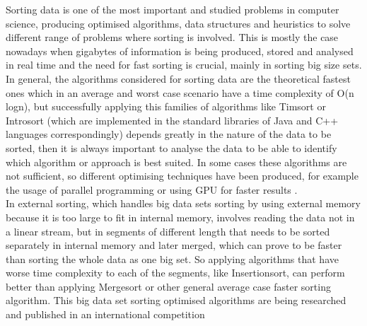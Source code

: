 \documentclass[a4paper,12pt]{article}
\begin{document}
Sorting data is one of the most important and studied problems in computer science, producing optimised algorithms, data structures and heuristics to solve different range of problems where sorting is involved. This is mostly the case nowadays when gigabytes of information is being produced, stored and analysed in real time and the need for fast sorting is crucial, mainly in sorting big size sets. In general, the algorithms considered for sorting data are the theoretical fastest ones which in an average and worst case scenario have a time complexity of O(n logn), but successfully applying this families of algorithms like Timsort\cite{Timsort} or Introsort\cite{musser1997introspective} (which are implemented in the standard libraries of Java and C++ languages correspondingly) depends greatly in the nature of the data to be sorted, then it is always important to analyse the data to be able to identify which algorithm or approach is best suited. In some cases these algorithms are not sufficient, so different optimising techniques have been produced, for example the usage of parallel programming or using GPU for faster results \cite{satish2009designing}. \\ 

In external sorting, which handles big data sets sorting by using external memory because it is too large to fit in internal memory, involves reading the data not in a linear stream, but in segments of different length that needs to be sorted separately in internal memory and later merged, which can prove to be faster than sorting the whole data as one big set. So applying algorithms that have worse time complexity to each of the segments, like Insertionsort, can perform better than applying Mergesort or other general average case faster sorting algorithm. This big data set sorting optimised algorithms are being researched and published in an international competition \cite{SortBenchmark} \\
\\
\end{document}
